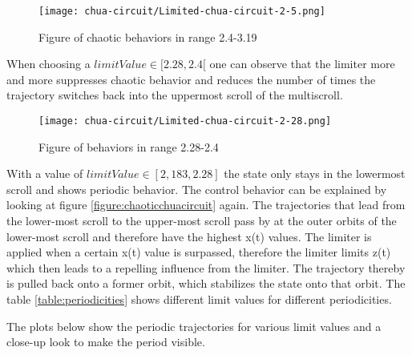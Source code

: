 \documentclass[main]{subfiles}
\begin{document}
\begin{figure}[H]
\centering
\texttt{[image: chua-circuit/Limited-chua-circuit-2-5.png]}
\caption[Figure of chaotic behaviors in range 2.4-3.19]{Figure of chaotic behaviors in range 2.4-3.19}
\label{figure:chaotictrajectories}
\end{figure}

When choosing a \(limitValue \in [2.28,2.4[\) one can observe that the limiter more and more suppresses chaotic behavior and reduces the number of times the trajectory switches back into the uppermost scroll of the multiscroll.

\begin{figure}[H]
\centering
\texttt{[image: chua-circuit/Limited-chua-circuit-2-28.png]}
\caption[Figure of behaviors in range 2.28-2.4]{Figure of behaviors in range 2.28-2.4}
\label{figure:chaotictrajectories}
\end{figure}

With a value of \(limitValue \in [2,183, 2.28]\) the state only stays in the lowermost scroll and shows periodic behavior. The control behavior can be explained by looking at figure \ref{figure:chaoticchuacircuit} again. The trajectories that lead from the lower-most scroll to the upper-most scroll pass by at the outer orbits of the lower-most scroll and therefore have the highest x(t) values. The limiter is applied when a certain x(t) value is surpassed, therefore the limiter limits z(t) which then leads to a repelling influence from the limiter. The trajectory thereby is pulled back onto a former orbit, which stabilizes the state onto that orbit. The table \ref{table:periodicities} shows different limit values for different periodicities.

\begin{comment}
\begin{table}
\center
\begin{tabular}{|l|l|l|l|l|l|l|l|l|l|l|l|l|}
   \hline
   limitValue & 2.215 & 2.211 & 2.2105 & 2.2101 & 2.2101 &  2.208 & 2.207 & 2.206 & 2.205 & 2.1995 & 2.183 \\
   \hline
   Limit Cycle Period & 24 & 11 & 9 & 8 & 7 & 6 & 5 & 4 & 3 & 2 \\
   \hline
\end{tabular}
\caption{Whatever}
\label{table:periodicities}
\end{table}
\end{comment}

The plots below show the periodic trajectories for various limit values and a close-up look to make the period visible.
\end{document}
